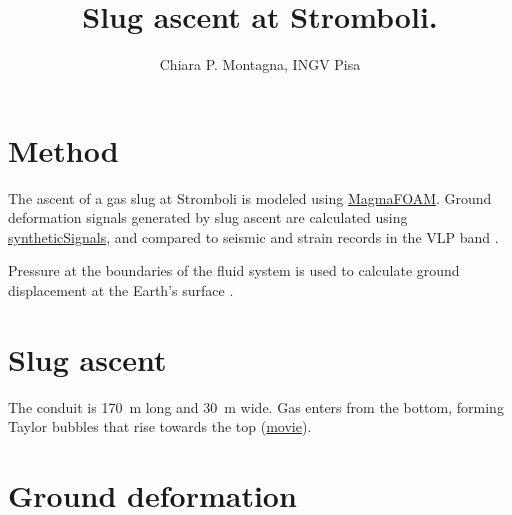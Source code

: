 \documentclass[11pt]{article}
\author{Chiara P. Montagna, INGV Pisa}
\title{Slug ascent at Stromboli.}
\begin{document}
 

\maketitle

\section{Method}
The ascent of a gas slug at Stromboli is modeled using
\href{https://zenodo.org/record/5031825\#.YgP13vso89k}{MagmaFOAM}.
Ground deformation signals generated by slug ascent are calculated using
\href{https://zenodo.org/record/4557510\#.YgP3svso89k}{syntheticSignals},
and compared to seismic and strain records in the VLP band \citep{Chouet2003,Mattia2021}.

Pressure at the boundaries of the fluid system is used to calculate
ground displacement at the Earth's surface \citep{Longo2012bv}.

\section{Slug ascent}
The conduit is \SI{170}{m} long and \SI{30}{m} wide. Gas
  enters from the bottom, forming Taylor bubbles that rise towards the top
  (\href{stromboli/movies/slug3.ogv}{movie}).

\section{Ground deformation}



\end{document}
